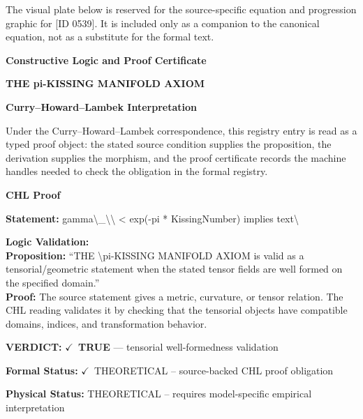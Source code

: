 \begingroup\footnotesize\sloppy
The visual plate below is reserved for the source-specific equation and progression graphic for [ID 0539]. It is included only as a companion to the canonical equation, not as a substitute for the formal text.
\par\endgroup
\ifTZPDarkEdition
{}
\fi

\clearpage
\begingroup\tzpsupportsetup
\noindent\textbf{\fontsize{10.8pt}{12.8pt}\selectfont [ID 0539] Constructive Logic and Proof Certificate}\par
\noindent\textbf{\fontsize{10pt}{12pt}\selectfont THE pi-KISSING MANIFOLD AXIOM}\par
\vspace{0.45em}
\begingroup
\footnotesize
\setlength{\parskip}{0.22em}
\setlength{\parindent}{0pt}
\noindent\textbf{Curry--Howard--Lambek Interpretation}\par
Under the Curry--Howard--Lambek correspondence, this registry entry is read as a typed proof
object: the stated source condition supplies the proposition, the derivation supplies the
morphism, and the proof certificate records the machine handles needed to check the obligation
in the formal registry.

\vspace{0.45em}
\noindent\textbf{CHL Proof}\par
\textbf{Statement:} gamma\textbackslash{}\_\textbackslash{}\textbackslash{} < exp(-pi * KissingNumber) implies text\textbackslash{}

\textbf{Logic Validation:}\\
\textbf{Proposition:} ``THE \textbackslash{}pi-KISSING MANIFOLD AXIOM is valid as a tensorial/geometric statement when the
stated tensor fields are well formed on the specified domain.''\\
\textbf{Proof:} The source statement gives a metric, curvature, or tensor relation. The CHL reading
validates it by checking that the tensorial objects have compatible domains, indices,
and transformation behavior.

\textbf{VERDICT:} \ensuremath{\checkmark}\ \textbf{TRUE} --- tensorial well-formedness validation

\textbf{Formal Status:} \ensuremath{\checkmark}\ THEORETICAL -- source-backed CHL proof obligation

\textbf{Physical Status:} THEORETICAL -- requires model-specific empirical interpretation
\par\vspace{0.45em}
\par
\ifTZPDarkEdition
{}
\fi
\endgroup
\endgroup
